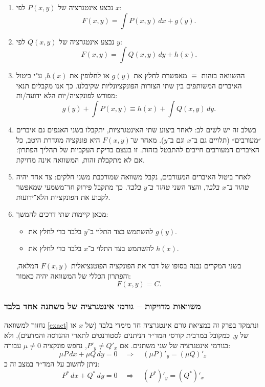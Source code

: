 \documentclass{article}
\numberwithin{equation}{section}
\begin{document}
\begin{enumerate}
\item נבצע אינטגרציה של $P(x,y)$ לפי $x$:
\[
F(x,y) = \int P(x,y)\,dx + g(y).
\]

\item נבצע אינטגרציה של $Q(x,y)$ לפי $y$:
\[
F(x,y) = \int Q(x,y)\,dy + h(x).
\]

\item ההשוואה בזהות \(\equiv\) מאפשרת לחלץ את $g(y)$ או לחלופין את $h(x)$, ע"י ביטול האיברים המשותפים בין שתי הצורות הפונקציונליות שקיבלנו. 
כך אנו מקבלים תנאי מפורש לפונקציה/יות הלא ידועה/ות:  
\[
g(y) + \int P(x,y) 
\equiv
h(x) + \int Q(x,y)\,dy.
\]
\item בשלב זה יש לשים לב: לאחר ביצוע שתי האינטגרציות, יתקבלו בשני האגפים גם איברים ״מעורבים״ (תלויים גם ב־$x$ וגם ב־$y$).  
מאחר ש־$F(x,y)$ היא פונקציה מוגדרת היטב, כל האיברים המעורבים חייבים להתבטל בזהות.  
זו בעצם בדיקת העקביות של תהליך הפתרון: אם לא מתקבלת זהות, המשוואה אינה מדויקת.

\item לאחר ביטול האיברים המעורבים, נקבל משוואה שמורכבת משני חלקים: צד אחד יהיה \emph{טהור ב־$x$ בלבד}, והצד השני \emph{טהור ב־$y$ בלבד}.  
כך מתקבל פירוק חד־משמעי שמאפשר לקבוע את הפונקציות הלא־ידועות.

\item מכאן קיימות שתי דרכים להמשך:
\begin{itemize}
  \item להשתמש בצד התלוי ב־$y$ בלבד כדי לחלץ את $g(y)$.
  \item להשתמש בצד התלוי ב־$x$ בלבד כדי לחלץ את $h(x)$.
\end{itemize}

בשני המקרים נבנה בסופו של דבר את הפונקציה הפוטנציאלית $F(x,y)$ המלאה, והפתרון הכללי של המשוואה יהיה כאמור:
\[
F(x,y) = C.
\]
\end{enumerate}

\subsubsection{משוואות מדויקות – גורמי אינטגרציה של משתנה אחד בלבד}

נחזור למשוואה \ref{exact} ונתמקד בפרק זה במציאת גורם אינטגרציה חד מימדי בלבד (של $x$ או של $y$, כמקובל במרבית קורסי המד׳׳ר הניתנים לסטודנטים לתארי ההנדסה והמדעים), ולא בגורמי אינטגרציה של שני משתנים.
אם $P'_y \neq Q'_x$, נחפש פונקציה $\mu\neq 0$ עבורה:
\[
\mu P\,dx + \mu Q\,dy = 0 
\quad \Rightarrow \quad 
(\mu P)'_y = (\mu Q)'_x
\]
ניתן לחשוב על המד׳׳ר במצב זה כ:
\begin{equation}
    P^{*}\,dx + Q^{*}\,dy = 0
    \quad \Rightarrow \quad 
    (P^{*})'_{y} = (Q^{*})'_{x}
\end{equation}
\end{document}
